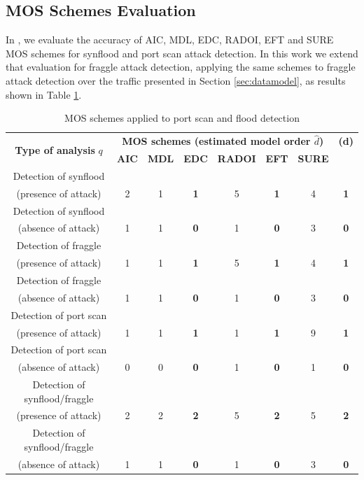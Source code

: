 \documentclass[review]{elsarticle}
\begin{document}
\subsection{MOS Schemes Evaluation}
\label{sec:MOSSchemesEvaluation}

In \cite{tenorio2013greatest}, we evaluate the accuracy of AIC, MDL, EDC, RADOI, EFT and SURE MOS schemes \cite{da2009comparison,tenorio2013greatest} for synflood and port scan attack detection. In this work we extend that evaluation for fraggle attack detection, applying the same schemes to fraggle attack detection over the traffic presented in Section \ref{sec:datamodel}, as results shown in Table \ref{tab:tab4}.

\begin{table}[h!]
  \centering
  \scriptsize
  \caption{MOS schemes applied to port scan and flood detection}
  \label{tab:tab4}
  \begin{tabular}{ c c c c c c c c }
	\toprule
	\multirow{2}{*}{\textbf{Type of analysis} $q$} &\multicolumn{6}{c}{\textbf{MOS schemes (estimated model order $\hat{d}$)}} &{\textbf{(d)}}\\ 
			\hhline{~------~}
		&\textbf{AIC} &\textbf{MDL} &\textbf{EDC} &\textbf{RADOI} &\textbf{EFT} &\textbf{SURE}\\
	\midrule
	Detection of synflood \\(presence of attack) &2 &1 &\textbf{1} &5 &\textbf{1} &4 &\textbf{1} \\
	Detection of synflood \\(absence of attack) &1 &1 &\textbf{0} &1 &\textbf{0} &3 &\textbf{0} \\
	\midrule
	Detection of fraggle \\(presence of attack) &1 &1 &\textbf{1} &5 &\textbf{1} &4 &\textbf{1} \\
	Detection of fraggle \\(absence of attack) &1 &1 &\textbf{0} &1 &\textbf{0} &3 &\textbf{0} \\
	\midrule
	Detection of port scan \\(presence of attack) &1 &1 &\textbf{1} &1 &\textbf{1} &9 &\textbf{1} \\
	Detection of port scan \\(absence of attack) &0 &0 &\textbf{0} &1 &\textbf{0} &1 &\textbf{0} \\
	\midrule
	Detection of synflood/fraggle \\(presence of attack) &2 &2 &\textbf{2} &5 &\textbf{2} &5 &\textbf{2} \\
	Detection of synflood/fraggle \\(absence of attack) &1 &1 &\textbf{0} &1 &\textbf{0} &3 &\textbf{0} \\
    \bottomrule
  \end{tabular}
\end{table}
\end{document}
